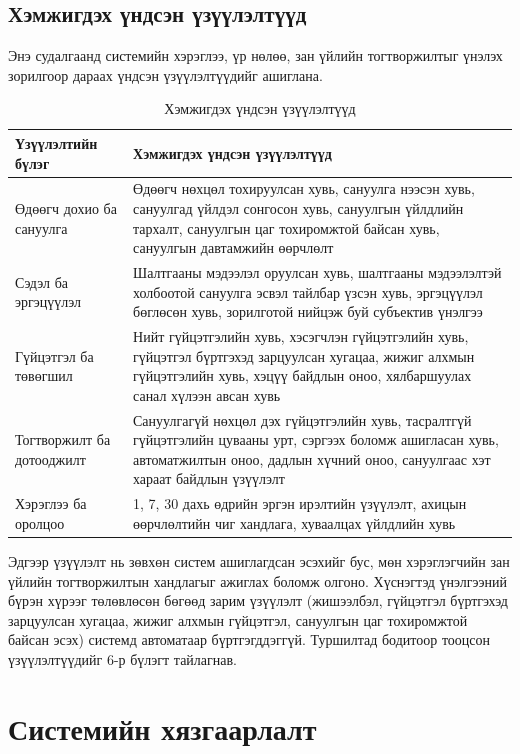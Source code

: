 \subsection{Хэмжигдэх үндсэн үзүүлэлтүүд}

Энэ судалгаанд системийн хэрэглээ, үр нөлөө, зан үйлийн тогтворжилтыг үнэлэх зорилгоор дараах үндсэн үзүүлэлтүүдийг ашиглана.

\begin{table}[htbp]
\centering
\small
\setlength{\tabcolsep}{4pt}
\begin{tabular}{|L{4.0cm}|L{9.0cm}|}
\hline
\textbf{Үзүүлэлтийн бүлэг} & \textbf{Хэмжигдэх үндсэн үзүүлэлтүүд} \\
\hline
Өдөөгч дохио ба сануулга & Өдөөгч нөхцөл тохируулсан хувь, сануулга нээсэн хувь, сануулгад үйлдэл сонгосон хувь, сануулгын үйлдлийн тархалт, сануулгын цаг тохиромжтой байсан хувь, сануулгын давтамжийн өөрчлөлт \\
\hline
Сэдэл ба эргэцүүлэл & Шалтгааны мэдээлэл оруулсан хувь, шалтгааны мэдээлэлтэй холбоотой сануулга эсвэл тайлбар үзсэн хувь, эргэцүүлэл бөглөсөн хувь, зорилготой нийцэж буй субъектив үнэлгээ \\
\hline
Гүйцэтгэл ба төвөгшил & Нийт гүйцэтгэлийн хувь, хэсэгчлэн гүйцэтгэлийн хувь, гүйцэтгэл бүртгэхэд зарцуулсан хугацаа, жижиг алхмын гүйцэтгэлийн хувь, хэцүү байдлын оноо, хялбаршуулах санал хүлээн авсан хувь \\
\hline
Тогтворжилт ба дотооджилт & Сануулгагүй нөхцөл дэх гүйцэтгэлийн хувь, тасралтгүй гүйцэтгэлийн цувааны урт, сэргээх боломж ашигласан хувь, автоматжилтын оноо, дадлын хүчний оноо, сануулгаас хэт хараат байдлын үзүүлэлт \\
\hline
Хэрэглээ ба оролцоо & 1, 7, 30 дахь өдрийн эргэн ирэлтийн үзүүлэлт, ахицын өөрчлөлтийн чиг хандлага, хуваалцах үйлдлийн хувь \\
\hline
\end{tabular}
\caption{Хэмжигдэх үндсэн үзүүлэлтүүд}
\end{table}

Эдгээр үзүүлэлт нь зөвхөн систем ашиглагдсан эсэхийг бус, мөн хэрэглэгчийн зан үйлийн тогтворжилтын хандлагыг ажиглах боломж олгоно. Хүснэгтэд үнэлгээний бүрэн хүрээг төлөвлөсөн бөгөөд зарим үзүүлэлт (жишээлбэл, гүйцэтгэл бүртгэхэд зарцуулсан хугацаа, жижиг алхмын гүйцэтгэл, сануулгын цаг тохиромжтой байсан эсэх) системд автоматаар бүртгэгддэггүй. Туршилтад бодитоор тооцсон үзүүлэлтүүдийг 6-р бүлэгт тайлагнав.

\section{Системийн хязгаарлалт}

